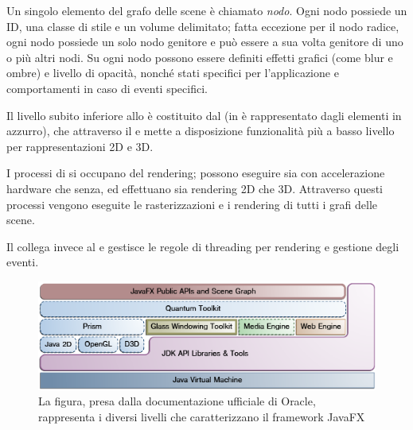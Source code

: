             Un singolo elemento del grafo delle scene è chiamato \emph{nodo}.
            Ogni nodo possiede un ID, una classe di stile e un volume delimitato;
            fatta eccezione per il nodo radice, ogni nodo possiede un solo nodo genitore e può essere a sua volta genitore di uno o più altri nodi.
            Su ogni nodo possono essere definiti effetti grafici (come blur e ombre) e livello di opacità, nonché stati specifici per l'applicazione e comportamenti in caso di eventi specifici.

            Il livello subito inferiore allo  è costituito dal  (in  è rappresentato dagli elementi in azzurro), che attraverso il  e  mette a disposizione funzionalità più a basso livello per rappresentazioni 2D e 3D.

            I processi di  si occupano del rendering;
            possono eseguire sia con accelerazione hardware che senza, ed effettuano sia rendering 2D che 3D.
            Attraverso questi processi vengono eseguite le rasterizzazioni e i rendering di tutti i grafi delle scene.

            Il  collega invece  al  e gestisce le regole di threading per rendering e gestione degli eventi.

            \begin{figure}[htbp]
                \centering
                \includegraphics[scale=0.75]{img/jfxArch}
                \caption[La figura, presa dalla documentazione ufficiale di Oracle, rappresenta i diversi livelli che caratterizzano il framework JavaFX]{La figura, presa dalla documentazione ufficiale di Oracle\protect\footnotemark, rappresenta i diversi livelli che caratterizzano il framework JavaFX}
                \label{fig:jfxArch}
            \end{figure}


